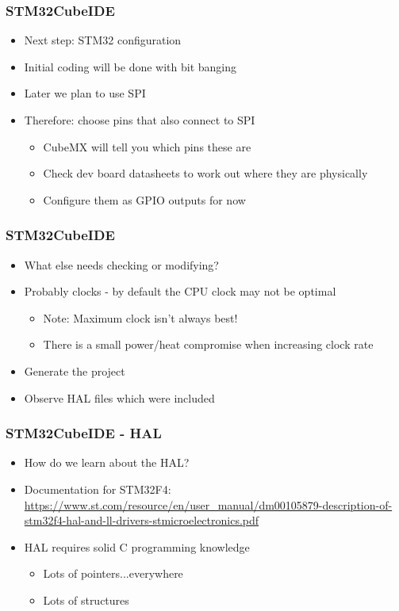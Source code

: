 \documentclass[14pt]{beamer}
\begin{document}
\begin{frame}[fragile]
\frametitle{STM32CubeIDE}
\begin{itemize}
\item Next step: STM32 configuration
\item Initial coding will be done with bit banging
\item Later we plan to use SPI
\item Therefore: choose pins that also connect to SPI
	\begin{itemize}
		\item CubeMX will tell you which pins these are
		\item Check dev board datasheets to work out where they are physically
		\item Configure them as GPIO outputs for now
	\end{itemize}
\end{itemize}
\end{frame}

\begin{frame}[fragile]
\frametitle{STM32CubeIDE}
\begin{itemize}
\item What else needs checking or modifying?
\pause
\item Probably clocks - by default the CPU clock may not be optimal
	\begin{itemize}
		\item Note: Maximum clock isn't always best!
		\item There is a small power/heat compromise when increasing clock rate
	\end{itemize}
\pause
\item Generate the project
\item Observe HAL files which were included
\end{itemize}
\end{frame}

\begin{frame}[fragile]
\frametitle{STM32CubeIDE - HAL}
\begin{itemize}
\item How do we learn about the HAL?
\item Documentation for STM32F4: \url{https://www.st.com/resource/en/user_manual/dm00105879-description-of-stm32f4-hal-and-ll-drivers-stmicroelectronics.pdf}
\item HAL requires solid C programming knowledge
	\begin{itemize}
		\item Lots of pointers...everywhere
		\item Lots of structures
	\end{itemize}
\end{itemize}
\end{frame}
\end{document}
